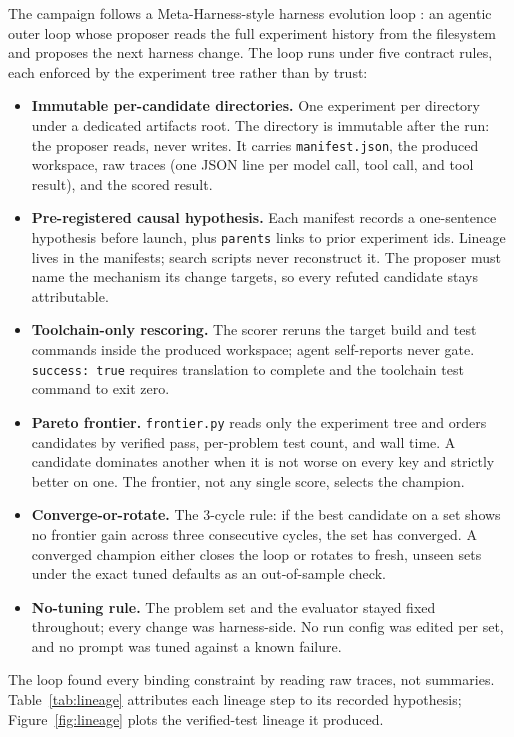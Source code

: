 \documentclass[11pt]{article}
\begin{document}
The campaign follows a Meta-Harness-style harness evolution loop
\cite{metaharness2026}: an agentic outer loop whose proposer reads the
full experiment history from the filesystem and proposes the next
harness change. The loop runs under five contract rules, each enforced
by the experiment tree rather than by trust:

\begin{itemize}
\item \textbf{Immutable per-candidate directories.} One experiment per
directory under a dedicated artifacts root. The directory is immutable
after the run: the proposer reads, never writes. It carries
\texttt{manifest.json}, the produced workspace, raw traces (one JSON
line per model call, tool call, and tool result), and the scored
result.
\item \textbf{Pre-registered causal hypothesis.} Each manifest records
a one-sentence hypothesis before launch, plus \texttt{parents} links to
prior experiment ids. Lineage lives in the manifests; search scripts
never reconstruct it. The proposer must name the mechanism its change
targets, so every refuted candidate stays attributable.
\item \textbf{Toolchain-only rescoring.} The scorer reruns the target
build and test commands inside the produced workspace; agent
self-reports never gate. \texttt{success: true} requires translation to
complete and the toolchain test command to exit zero.
\item \textbf{Pareto frontier.} \texttt{frontier.py} reads only the
experiment tree and orders candidates by verified pass, per-problem
test count, and wall time. A candidate dominates another when it is
not worse on every key and strictly better on one. The frontier, not
any single score, selects the champion.
\item \textbf{Converge-or-rotate.} The 3-cycle rule: if the best
candidate on a set shows no frontier gain across three consecutive
cycles, the set has converged. A converged champion either closes the
loop or rotates to fresh, unseen sets under the exact tuned defaults
as an out-of-sample check.
\item \textbf{No-tuning rule.} The problem set and the evaluator stayed
fixed throughout; every change was harness-side. No run
config was edited per set, and no prompt was tuned against a known
failure.
\end{itemize}

The loop found every binding constraint by reading raw traces, not
summaries. Table~\ref{tab:lineage} attributes each lineage step to its
recorded hypothesis; Figure~\ref{fig:lineage} plots the verified-test
lineage it produced.
\end{document}
